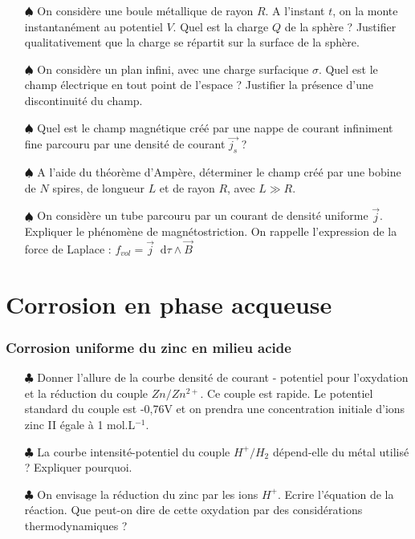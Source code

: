 \documentclass{report}
\newcommand*\dif{\mathop{}\!\mathrm{d}}
\begin{document}
\begin{itemize}

	\item[$\spadesuit$] On considère une boule métallique de rayon $R$. A l'instant $t$, on la monte instantanément au potentiel $V$. Quel est la charge $Q$ de la sphère ? Justifier qualitativement que la charge se répartit sur la surface de la sphère.
	
	\item[$\spadesuit$] On considère un plan infini, avec une charge surfacique $\sigma$. Quel est le champ électrique en tout point de l'espace ? Justifier la présence d'une discontinuité du champ. 
	
	\item[$\spadesuit$] Quel est le champ magnétique créé par une nappe de courant infiniment fine parcouru par une densité de courant $\vec{j_s}$ ? 
	
	\item[$\spadesuit$] A l'aide du théorème d'Ampère, déterminer le champ créé par une bobine de $N$ spires, de longueur $L$ et de rayon $R$, avec $L\gg R$.
	
	\item[$\spadesuit$] On considère un tube parcouru par un courant de densité uniforme $\vec{j}$. Expliquer le phénomène de magnétostriction. On rappelle l'expression de la force de Laplace : $f_{vol}=\vec{j}\dif\tau\wedge\vec{B}$
	
\end{itemize}

\newpage

\section*{Corrosion en phase acqueuse}

\subsubsection*{Corrosion uniforme du zinc en milieu acide}

\begin{itemize}

	\item[$\clubsuit$] Donner l'allure de la courbe densité de courant - potentiel pour l'oxydation et la réduction du couple $Zn/Zn^{2+}$. Ce couple est rapide. Le potentiel standard du couple est -0,76V et on prendra une concentration initiale d'ions zinc II égale à 1 mol.L$^{-1}$.
	
	\item[$\clubsuit$] La courbe intensité-potentiel du couple $H^+/H_2$ dépend-elle du métal utilisé ? Expliquer pourquoi.
	
	\item[$\clubsuit$] On envisage la réduction du zinc par les ions $H^+$. Ecrire l'équation de la réaction. Que peut-on dire de cette oxydation par des considérations thermodynamiques ?

\end{itemize}
\end{document}
